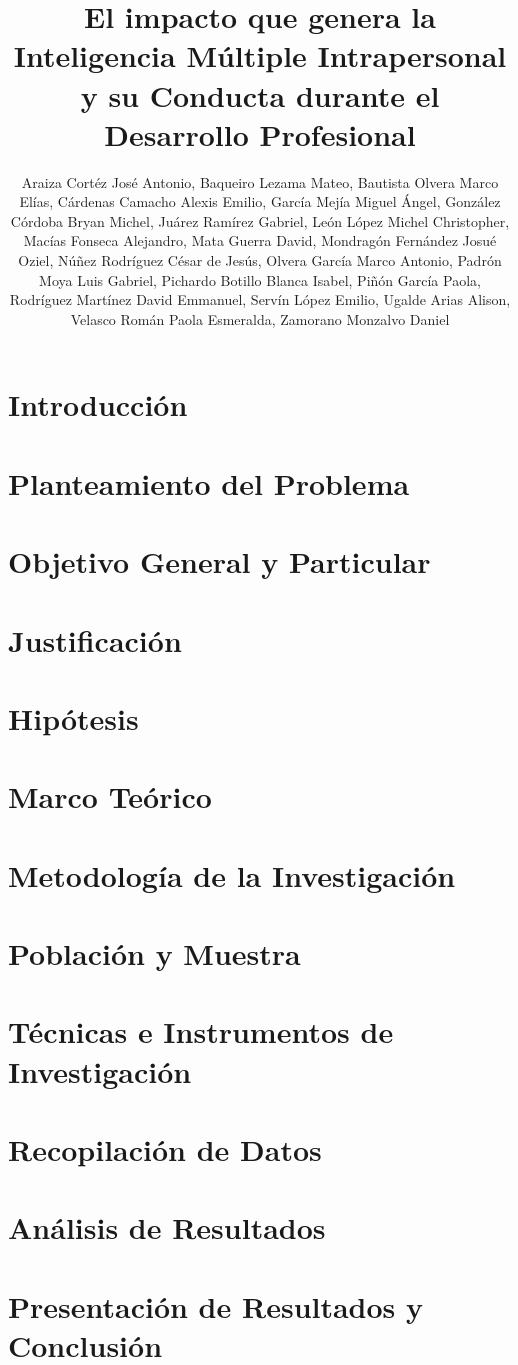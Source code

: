 \documentclass[stu,12pt]{apa7}
\affiliation{Facultad de Inform\'atica, Universidad Aut\'onoma de Quer\'etaro}
\title{El impacto que genera la Inteligencia M\'ultiple Intrapersonal y su
Conducta durante el Desarrollo Profesional}
\author{Araiza Cort\'ez Jos\'e Antonio, Baqueiro Lezama Mateo, Bautista Olvera
Marco El\'ias, C\'ardenas Camacho Alexis Emilio, Garc\'ia Mej\'ia Miguel
\'Angel, Gonz\'alez C\'ordoba Bryan Michel, Ju\'arez Ram\'irez Gabriel, Le\'on
L\'opez Michel Christopher, Mac\'ias Fonseca Alejandro, Mata Guerra David, 
Mondrag\'on Fern\'andez Josu\'e Oziel, N\'u\~nez Rodr\'iguez C\'esar de Jes\'us,
Olvera Garc\'ia Marco Antonio, Padr\'on Moya Luis Gabriel, Pichardo Botillo
Blanca Isabel, Pi\~n\'on Garc\'ia Paola, Rodr\'iguez Mart\'inez David Emmanuel,
Serv\'in L\'opez Emilio, Ugalde Arias Alison, Velasco Rom\'an Paola Esmeralda,
Zamorano Monzalvo Daniel}
\begin{document}
\maketitle
\tableofcontents
\section{Introducci\'on}

\section{Planteamiento del Problema}

\section{Objetivo General y Particular}

\section{Justificaci\'on}

\section{Hip\'otesis}

\section{Marco Te\'orico}

\section{Metodolog\'ia de la Investigaci\'on}

\section{Poblaci\'on y Muestra}

\section{T\'ecnicas e Instrumentos de Investigaci\'on}

\section{Recopilaci\'on de Datos}

\section{An\'alisis de Resultados}

\section{Presentaci\'on de Resultados y Conclusi\'on}

\begin{appendix}

\end{appendix}
\printbibliography
\end{document}
